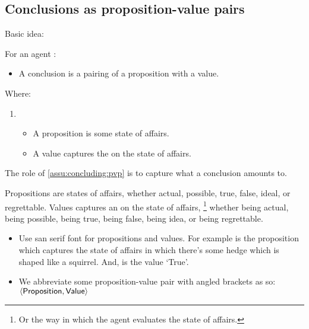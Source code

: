 \subsection{Conclusions as proposition-value pairs}
\label{cha:clar:sec:Cons:pvp}

\begin{note}
  Basic idea:

  \begin{idea}
    \label{assu:concluding:pvp}
    For an agent \vAgent{}:

    \begin{itemize}
    \item
      A conclusion is a pairing of a proposition with a value.
    \end{itemize}

    Where:
    \begin{enumerate}[noitemsep, label=]
    \item
      \begin{itemize}[noitemsep]
      \item
        A proposition is some state of affairs.
      \item
        A value captures the \agpe{} on the state of affairs.
      \end{itemize}
    \end{enumerate}
    \vspace{-\baselineskip}
  \end{idea}

  The role of \autoref{assu:concluding:pvp} is to capture what a conclusion amounts to.

  Propositions are states of affairs, whether actual, possible, true, false, ideal, or regrettable.
  Values captures an \agpe{} on the state of affairs,%
  \footnote{
    Or the way in which the agent evaluates the state of affairs.
  }
  whether being actual, being possible, being true, being false, being idea, or being regrettable.

  \begin{notation}
    \begin{itemize}
    \item
      Use san serif font for propositions and values.
      For example  is the proposition which captures the state of affairs in which there's some hedge which is shaped like a squirrel.
      And,  is the value `True'.
    \item
      We abbreviate some proposition-value pair with angled brackets as so:
      \(\pv{\prop{Proposition}}{\val{Value}}\)
    \end{itemize}
    \vspace{-\baselineskip}
  \end{notation}


\end{note}
